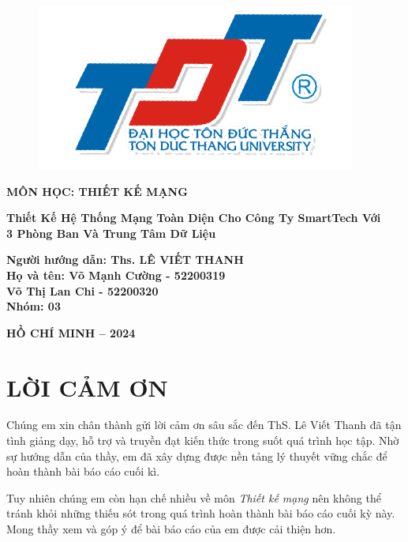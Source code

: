 \documentclass[13pt]{report}
\begin{document}
	\vspace{1cm}
	\begin{figure}[h]
		\centering
		\includegraphics[width=0.3\linewidth]{img/Logo.png}
	\end{figure}	
	\fontsize{18pt}{18pt}\selectfont
	\begin{center}
		\textbf{MÔN HỌC: THIẾT KẾ MẠNG}
	\end{center}
	\vspace{1cm}
	\fontsize{18pt}{16pt}\selectfont
	\begin{center}\Huge
		\textbf{Thiết Kế Hệ Thống Mạng Toàn Diện Cho Công Ty SmartTech Với \\3 Phòng Ban Và Trung Tâm Dữ Liệu }	
	\end{center}
    \vspace{2cm}
    \fontsize{16pt}{16pt}\selectfont
    \begin{flushright}
        \textbf{Người hướng dẫn: Ths. LÊ VIẾT THANH\\ Họ và tên: Võ Mạnh Cường - 52200319 \\ Võ Thị Lan Chi - 52200320\\Nhóm: 03}
    \end{flushright}
	\vspace{2cm}
	\begin{center}
		\textbf{HỒ CHÍ MINH – 2024}
	\end{center}
    \newpage
    \fontsize{15pt}{18pt}\selectfont
    \section*{\centering LỜI CẢM ƠN}
    Chúng em xin chân thành gửi lời cảm ơn sâu sắc đến ThS. Lê Viết Thanh đã tận tình giảng dạy, hỗ trợ và truyền đạt kiến thức trong suốt quá trình học tập. Nhờ sự hướng dẫn của thầy, em đã xây dựng được nền tảng lý thuyết vững chắc để hoàn thành bài báo cáo cuối kì.

    Tuy nhiên chúng em còn hạn chế nhiều về môn \textit{Thiết kế mạng} nên không thể tránh khỏi những thiếu sót trong quá trình hoàn thành bài báo cáo cuối kỳ này. Mong thầy xem và góp ý để bài báo cáo của em được cải thiện hơn.
\end{document}
